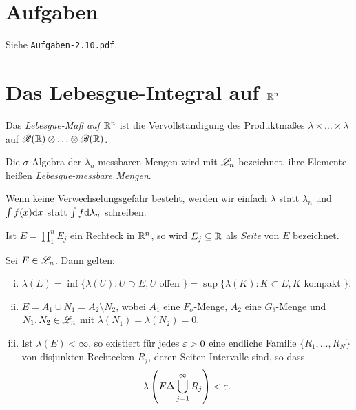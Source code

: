 \section{Aufgaben}
Siehe \verb+Aufgaben-2.10.pdf+.

\section{Das Lebesgue-Integral auf \texorpdfstring{$\mathbb{R}^n$}{IRn}}
\begin{defn}
 Das \emph{Lebesgue-Maß auf $\mathbb{R}^n$} ist die Vervollständigung des
 Produktmaßes $\lambda \times \ldots \times \lambda$ auf $\mathscr{B}(\mathbb{R}) \otimes
 \ldots \otimes \mathscr{B}(\mathbb{R})$. 
\end{defn}
 
Die $\sigma$-Algebra der $\lambda_n$-messbaren Mengen wird mit $\mathscr{L}_n$
bezeichnet, ihre Elemente heißen \emph{Lebesgue-messbare Mengen}. 
 
Wenn keine Verwechselungsgefahr besteht, werden wir einfach $\lambda$ statt
$\lambda_n$ und $\int f(x) \mathrm{d} x$ statt $\int f \mathrm{d} \lambda_n$
schreiben.
 
Ist $E  = \prod_1^n E_j$ ein Rechteck in $\mathbb{R}^n$, so wird $E_j \subseteq
\mathbb{R}$ als \emph{Seite} von $E$ bezeichnet.

\clearpage

\begin{thm}\label{thm:2-11-2}
  Sei $E \in \mathscr{L}_n$. Dann gelten:
  \begin{enumerate}[(i)]
  \item $\lambda(E) = \inf \{ \lambda(U) : U \supset E, U$ offen $\} = \sup \{
    \lambda(K) : K \subset E, K $ kompakt $\}$.
  \item $E = A_1 \cup N_1 = A_2 \setminus N_2$, wobei $A_1$ eine
    $F_\sigma$-Menge, $A_2$ eine $G_\delta$-Menge und $N_1, N_2 \in \mathscr{L}_n$
    mit $\lambda(N_1) = \lambda(N_2)=0$.
  \item Ist $\lambda(E) < \infty$, so existiert für jedes $\varepsilon > 0$ eine
    endliche Familie $\{ R_1, \ldots, R_N\}$ von disjunkten Rechtecken $R_j$,
    deren Seiten Intervalle sind, so dass
    \[ \lambda \left(E \Delta \bigcup_{j=1}^\infty R_j \right) < \varepsilon. \]
  \end{enumerate}
\end{thm}

